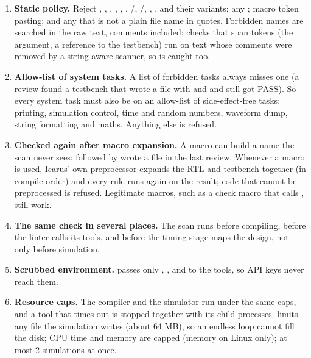 \begin{enumerate}
  \item \textbf{Static policy.} Reject , , , , , , /, /, , ,  and their variants; any ; macro token pasting; and any  that is not a plain file name in quotes. Forbidden names are searched in the raw text, comments included; checks that span tokens (the  argument, a reference to the testbench) run on text whose comments were removed by a string-aware scanner, so  is caught too.
  \item \textbf{Allow-list of system tasks.} A list of forbidden tasks always misses one (a review found a testbench that wrote a file with  and  and still got PASS). So every system task must also be on an allow-list of side-effect-free tasks: printing, simulation control, time and random numbers, waveform dump, string formatting and maths. Anything else is refused.
  \item \textbf{Checked again after macro expansion.} A macro can build a name the scan never sees:  followed by  wrote a file in the last review. Whenever a macro is used, Icarus' own preprocessor expands the RTL and testbench together (in compile order) and every rule runs again on the result; code that cannot be preprocessed is refused. Legitimate macros, such as a check macro that calls , still work.
  \item \textbf{The same check in several places.} The scan runs before compiling, before the linter calls its tools, and before the timing stage maps the design, not only before simulation.
  \item \textbf{Scrubbed environment.}  passes only , ,  and  to the tools, so API keys never reach them.
  \item \textbf{Resource caps.} The compiler and the simulator run under the same caps, and a tool that times out is stopped together with its child processes.  limits any file the simulation writes (about 64 MB), so an endless  loop cannot fill the disk; CPU time and memory are capped (memory on Linux only); at most 2 simulations at once.
\end{enumerate}

